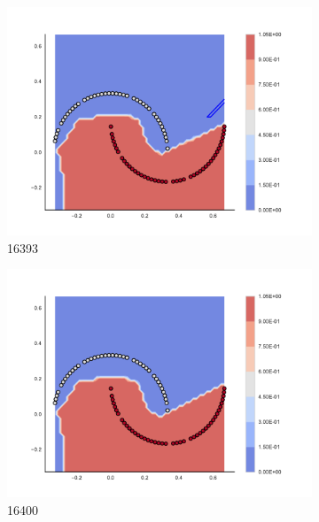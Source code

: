 \begin{figure}[h]
\begin{subfigure}[b]{0.09\textwidth}
    \includegraphics[clip, trim=2.35cm 1.75cm 4.5cm 0cm,width=\textwidth]{img/convergence/16393.pdf}
    \caption{16393}
    \label{fig:convergence_16393}
\end{subfigure}
%
\begin{subfigure}[b]{0.09\textwidth}
    \includegraphics[clip, trim=2.35cm 1.75cm 4.5cm 0cm,width=\textwidth]{img/convergence/16400.pdf}
    \caption{16400}
    \label{fig:convergence_16400}
\end{subfigure}
%
\begin{subfigure}[b]{0.09\textwidth}

\end{subfigure}
\end{figure}
